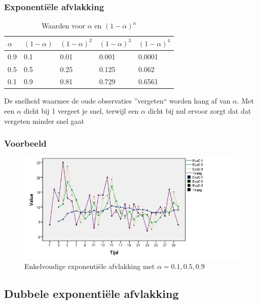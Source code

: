 \documentclass[aspectratio=169]{beamer}
\begin{document}
\begin{frame}
  \frametitle{Exponentiële afvlakking}

  \begin{table}
    \centering
    \begin{tabular}{l|llll}
      $\alpha$ & $(1-\alpha)$ & $(1-\alpha)^{2}$ & $(1-\alpha)^{3}$ & $(1-\alpha)^{4}$ \\ \hline
      0.9   & 0.1       & 0.01             & 0.001                      & 0.0001           \\
      0.5   & 0.5       & 0.25             & 0.125                      & 0.062            \\
      0.1   & 0.9       & 0.81             & 0.729                      & 0.6561           \\
    \end{tabular}
    \caption{Waarden voor $\alpha$ en $(1-\alpha)^{n}$}
    \label{tab:alpha}
  \end{table}
  De snelheid waarmee de oude observaties ''vergeten`` worden hang af van $\alpha$. Met een $\alpha$ dicht bij 1 vergeet je snel, terwijl een $\alpha$ dicht bij nul ervoor zorgt dat dat vergeten minder snel gaat
\end{frame}


\begin{frame}
  \frametitle{Voorbeeld}
  \begin{figure}[htbp]
    \centering
    \includegraphics[width=\textwidth]{img/tijdreeks51}
    \caption{Enkelvoudige exponentiële afvlakking met $\alpha=0.1 , 0.5, 0.9$}
    \label{fig:tijdreeks51}
  \end{figure}
\end{frame}

\subsection{Dubbele exponenti\"ele afvlakking}
\end{document}
